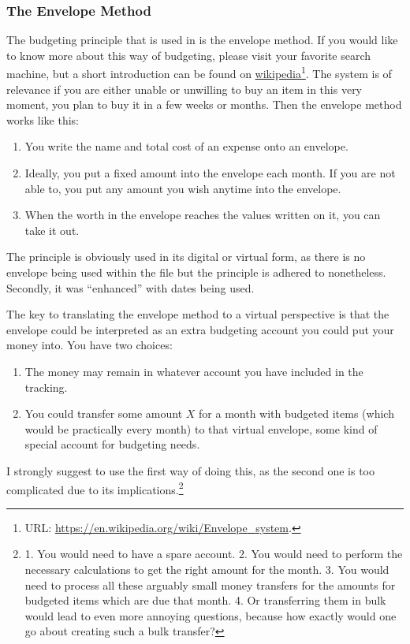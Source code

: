 \subsubsection{The Envelope Method}
\label{subsubsec:budgeting-the-envelope-method}

The budgeting principle that is used in \tfn is the envelope method.
If you would like to know more about this way of budgeting, please visit your favorite search machine, but a short introduction can be found on \href{https://en.wikipedia.org/wiki/Envelope_system}{wikipedia}\footnote{URL: \href{https://en.wikipedia.org/wiki/Envelope_system}{https://en.wikipedia.org/wiki/Envelope{\_}system}.}.
The system is of relevance if you are either unable or unwilling to buy an item in this very moment, \ie you plan to buy it in a few weeks or months.
Then the envelope method works like this:
\begin{enumerate}
	\item You write the name and total cost of an expense onto an envelope.
	\item Ideally, you put a fixed amount into the envelope each month.
	If you are not able to, you put any amount you wish anytime into the envelope.
	\item When the worth in the envelope reaches the values written on it, you can take it out.
\end{enumerate}
The principle is obviously used in its digital or virtual form, as there is no envelope being used within the file but the principle is adhered to nonetheless.
Secondly, it was ``enhanced'' with dates being used.

The key to translating the envelope method to a virtual perspective is that the envelope could be interpreted as an extra budgeting account you could put your money into.
You have two choices:
\begin{enumerate}
	\item The money may remain in whatever account you have included in the tracking.
	\item You could transfer some amount \( X \) for a month with budgeted items (which would be practically every month) to that virtual envelope, \ie some kind of special account for budgeting needs.
\end{enumerate}

I strongly suggest to use the first way of doing this, as the second one is too complicated due to its implications.\footnote{%
1. You would need to have a spare account.%
2. You would need to perform the necessary calculations to get the right amount for the month.%
3. You would need to process all these arguably small money transfers for the amounts for budgeted items which are due that month.%
4. Or transferring them in bulk would lead to even more annoying questions, because how exactly would one go about creating such a bulk transfer?}

